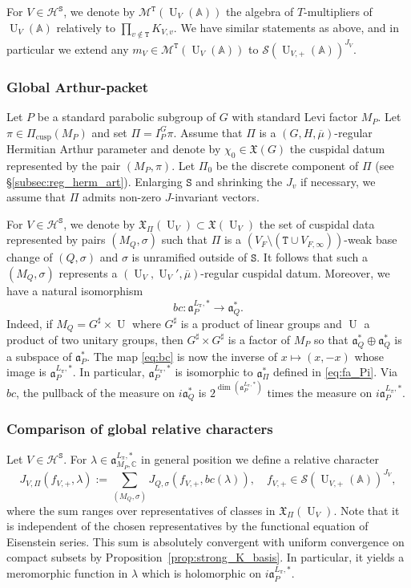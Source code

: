\documentclass[letterpaper,11pt]{amsart}
\newcommand{\fa}{\mathfrak{a}}
\newcommand{\fX}{\mathfrak{X}}
\newcommand{\bA}{\mathbb{A}}
\newcommand{\C}{\mathbb{C}}
\newcommand{\cH}{\mathcal{H}}
\newcommand{\cM}{\mathcal{M}}
\newcommand{\cS}{\mathcal{S}}
\newcommand{\tS}{\mathtt{S}}
\newcommand{\tT}{\mathtt{T}}
\newcommand{\<}{\negthickspace}
\DeclareMathOperator{\U}{U}
\DeclareMathOperator{\cusp}{cusp}
\theoremstyle{definition}
\theoremstyle{plain}
\theoremstyle{remark}
\numberwithin{equation}{section}
\begin{document}
For $V \in \cH^\tS$, we denote by $\cM^{\tT}(\U_V(\bA))$ the algebra of $T$-multipliers of $\U_V(\bA)$ relatively to $\prod_{v \not \in \tT} K_{V,v}$. We have similar statements as above, and in particular we extend any $m_V \in \cM^\tT(\U_V(\bA))$ to $\cS(\U_{V,+} (\bA))^{J_V}$.


\subsubsection{Global Arthur-packet}
\label{subsec:cuspi_arthur} 
Let $P$ be a standard parabolic subgroup of $G$ with standard Levi factor $M_P$. Let $\pi \in \Pi_{\cusp}(M_P)$ and set $\Pi=I_{P}^{G} \pi$. Assume that $\Pi$ is a $(G,H,\overline{\mu})$-regular Hermitian Arthur parameter and denote by $\chi_0 \in \fX(G)$ the cuspidal datum represented by the pair $(M_P,\pi)$. Let $\Pi_0$ be the discrete component of $\Pi$ (see \S\ref{subsec:reg_herm_art}). Enlarging $\tS$ and shrinking the $J_v$ if necessary, we assume that $\Pi$ admits non-zero $J$-invariant vectors.


For $V \in \cH^\tS$, we denote by $\fX_\Pi(\U_V) \subset \fX(\U_V)$ the set of cuspidal data represented by pairs $(M_{Q},\sigma)$ such that $\Pi$ is a $(V_F \setminus (\tT \cup V_{F,\infty}))$-weak base change of $(Q,\sigma)$ and $\sigma$ is unramified outside of $\tS$. It follows that such a $(M_{Q},\sigma)$ represents a $(\U_V,\U_V',\overline{\mu})$-regular cuspidal datum. Moreover, we have a natural isomorphism
\begin{equation}
\label{eq:bc}
    bc : \fa_{P}^{L_\pi,*} \to \fa_{{Q}}^*.
\end{equation}
Indeed, if $M_Q=G^\sharp \times \U$ where $G^\sharp$ is a product of linear groups and $\U$ a product of two unitary groups, then $G^\sharp \times G^\sharp$ is a factor of $M_P$ so that $\fa_{Q}^* \oplus \fa_{Q}^*$ is a subspace of $\fa_{P}^*$. The map \eqref{eq:bc} is now the inverse
of $x \mapsto(x,-x)$ whose image is $\fa_{P}^{L_\pi,*}$. In particular, $\fa_{P}^{L_\pi,*}$ is isomorphic to $\fa_\Pi^*$ defined in \eqref{eq:fa_Pi}. Via $bc$,
the pullback of the measure on $i\fa_{Q}^*$ is
$2^{\dim(\fa_{P}^{L_\pi,*})}$ times the measure on
$i\fa_{P}^{L_\pi,*}$.

\subsubsection{Comparison of global relative characters}

Let $V \in \cH^\tS$. For $\lambda \in \fa_{M_P,\C}^{L_\pi,*}$ in general position we define a relative character
\begin{equation}
    \label{eq:J_Pi_big}
        J_{V,\Pi}( f_{V,+},\lambda):=\sum_{(M_{Q},\sigma)} J_{Q,\sigma}(f_{V,+},bc(\lambda)), \quad f_{V,+} \in \cS(\U_{V,+}(\bA))^{J_V},
    \end{equation}
where the sum ranges over representatives of classes in $\fX_\Pi(\U_V)$. Note that it is independent of the chosen representatives by the functional equation of Eisenstein series. This sum is absolutely convergent with uniform convergence on compact subsets by Proposition~\ref{prop:strong_K_basis}. In particular, it yields a meromorphic function in $\lambda$ which is holomorphic on $i \fa_{P}^{L_\pi,*}$.
\end{document}
